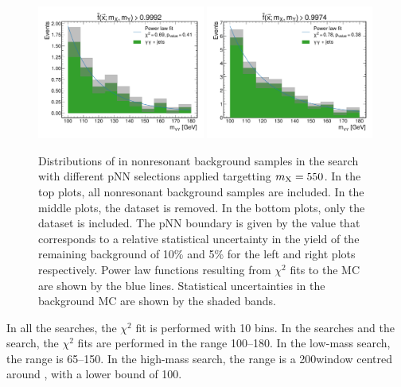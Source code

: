 \begin{figure}
    \includegraphics[width=0.49\textwidth]{Figures/Dihiggs/categorisation/mgg_sculpting/graviton/only_diphoton/intermediate_transformed_score_GluGluToBulkGravitonToHHTo2G2Tau_M-550_frac_uncert_0.1.pdf}
    \includegraphics[width=0.49\textwidth]{Figures/Dihiggs/categorisation/mgg_sculpting/graviton/only_diphoton/intermediate_transformed_score_GluGluToBulkGravitonToHHTo2G2Tau_M-550_frac_uncert_0.05.pdf}
    \caption[Evidence of No \mgg Sculpting in \XTwoHH at $\mX = 550$\GeV]{Distributions of \mgg in nonresonant background samples in the \XTwoHH search with different pNN selections applied targetting $\mX = 550$\GeV. In the top plots, all nonresonant background samples are included. In the middle plots, the \gjet dataset is removed. In the bottom plots, only the \ggjet dataset is included. The pNN boundary is given by the value that corresponds to a relative statistical uncertainty in the yield of the remaining background of 10\% and 5\% for the left and right plots respectively. Power law functions resulting from $\chi^2$ fits to the MC are shown by the blue lines. Statistical uncertainties in the background MC are shown by the shaded bands.}\label{fig:mgg_sculpting_graviton_550}
\end{figure}

In all the searches, the $\chi^2$ fit is performed with 10 bins. In the \XHH searches and the \XYttHgg search, the $\chi^2$ fits are performed in the range 100--180\GeV. In the low-mass \XYggHtt search, the range is 65--150\GeV. In the high-mass \XYggHtt search, the range is a 200\GeV window centred around \mY, with a lower bound of 100\GeV.

